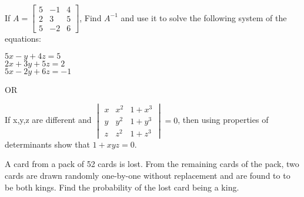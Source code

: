 \documentclass[legalpaper, 12pt, addpoints]{exam}
\begin{document}
\begin{questions}
\question If $A=\begin{bmatrix}5 & -1 & 4 \\ 2 & 3 & 5 \\ 5 & -2 & 6 \end{bmatrix} $, Find $A^{-1}$ and use it to solve the following system of the equations: \\
\begin{center}
        $5x-y+4z=5 $\\
        $2x+3y+5z=2 $\\
        $5x-2y+6z=-1 $
    \end{center}
    
    \begin{center}
        OR
    \end{center}
If x,y,z are different and $\begin{vmatrix}x & x^2 & 1+x^3 \\ y & y^2 & 1+y^3 \\ z & z^2 & 1+z^3 \end{vmatrix} =0 $, then using properties of determinants show that $1+xyz=0.$  

\question A card from a pack of 52 cards is lost. From the remaining cards of the pack, two cards are drawn randomly one-by-one without replacement and are found to to be both kings. Find the probability of the lost card being a king. 

\vspace{0.10in}

\end{questions}
\end{document}
